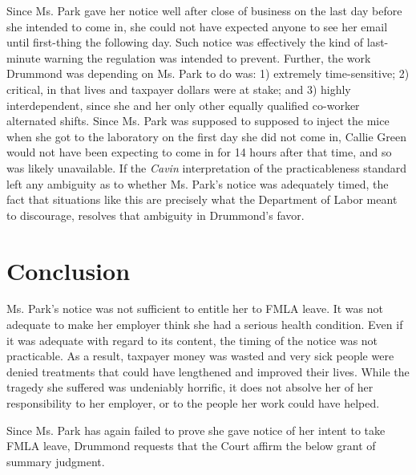 Since Ms. Park gave her notice well after close of business on the last day before she intended to come in, she could not have expected anyone to see her email until first-thing the following day. Such notice was effectively the kind of last-minute warning the regulation was intended to prevent. Further, the work Drummond was depending on Ms. Park to do was: 1) extremely time-sensitive; 2) critical, in that lives and taxpayer dollars were at stake; and 3) highly interdependent, since she and her only other equally qualified co-worker alternated shifts. Since Ms. Park was supposed to supposed to inject the mice when she got to the laboratory on the first day she did not come in, Callie Green would not have been expecting to come in for 14 hours after that time, and so was likely unavailable. If the \emph{Cavin} interpretation of the practicableness standard left any ambiguity as to whether Ms. Park's notice was adequately timed, the fact that situations like this are precisely what the Department of Labor meant to discourage, resolves that ambiguity in Drummond's favor. 

\part{Conclusion}
\label{conclusion}

Ms. Park's notice was not sufficient to entitle her to FMLA leave. It was not adequate to make her employer think she had a serious health condition. Even if it was adequate with regard to its content, the timing of the notice was not practicable. As a result, taxpayer money was wasted and very sick people were denied treatments that could have lengthened and improved their lives. While the tragedy she suffered was undeniably horrific, it does not absolve her of her responsibility to her employer, or to the people her work could have helped. 

Since Ms. Park has again failed to prove she gave notice of her intent to take FMLA leave, Drummond requests that the Court affirm the below grant of summary judgment.




